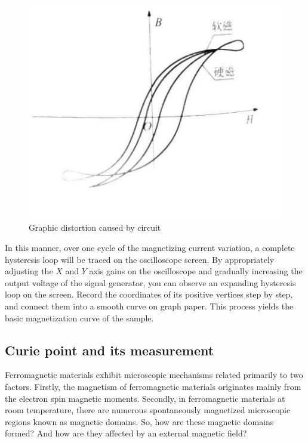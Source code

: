 \documentclass[UTF8]{article}
\begin{document}
        \begin{figure}[H]
           	    	\centering
           	    	\includegraphics[clip,scale=0.9,trim={0 0 0 0}]{fig/fig8.png}
           	        \caption{Graphic distortion caused by circuit}
           	        \label{figure.1}
               \end{figure}  
               
     In this manner, over one cycle of the magnetizing current variation, a complete hysteresis loop will be traced on the oscilloscope screen. By appropriately adjusting the $X$ and $Y$ axis gains on the oscilloscope and gradually increasing the output voltage of the signal generator, you can observe an expanding hysteresis loop on the screen. Record the coordinates of its positive vertices step by step, and connect them into a smooth curve on graph paper. This process yields the basic magnetization curve of the sample.          
               
     \subsection{Curie point and its measurement}          
      Ferromagnetic materials exhibit microscopic mechanisms related primarily to two factors. Firstly, the magnetism of ferromagnetic materials originates mainly from the electron spin magnetic moments. Secondly, in ferromagnetic materials at room temperature, there are numerous spontaneously magnetized microscopic regions known as magnetic domains. So, how are these magnetic domains formed? And how are they affected by an external magnetic field?
      
\end{document}

